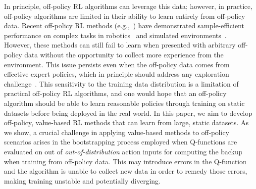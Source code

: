 In principle, off-policy RL algorithms can leverage this data; however, in practice, off-policy algorithms are limited in their ability to learn entirely from off-policy data. %
Recent off-policy RL methods   (e.g.,~\citep{haarnoja2018sac,munos2016safe,kalashnikov18qtopt,impala2018}) have demonstrated sample-efficient performance on complex tasks in robotics~\cite{kalashnikov18qtopt} and simulated environments~\cite{mujoco}. 
However, these methods can still fail to learn when presented with arbitrary off-policy data without the opportunity to collect more experience from the environment. This issue persists even when the off-policy data comes from effective expert policies, which in principle should address any exploration challenge~\citep{deBruin2015importance,fujimoto2018off,fu2019diagnosing}. This sensitivity to the training data distribution is a limitation of practical off-policy RL algorithms, and one would hope that an off-policy algorithm should be able to learn reasonable policies through training on static datasets before being deployed in the real world. %
In this paper, we aim to develop off-policy, value-based RL methods that can learn from large, static datasets. As we show, a crucial challenge in applying value-based methods to off-policy scenarios arises in the bootstrapping process employed
when Q-functions are evaluated on out of \textit{out-of-distribution} action inputs for computing the backup when training from off-policy data. This may introduce errors in the Q-function and the algorithm is unable to collect new data in order to remedy those errors, making training unstable and potentially diverging. %
